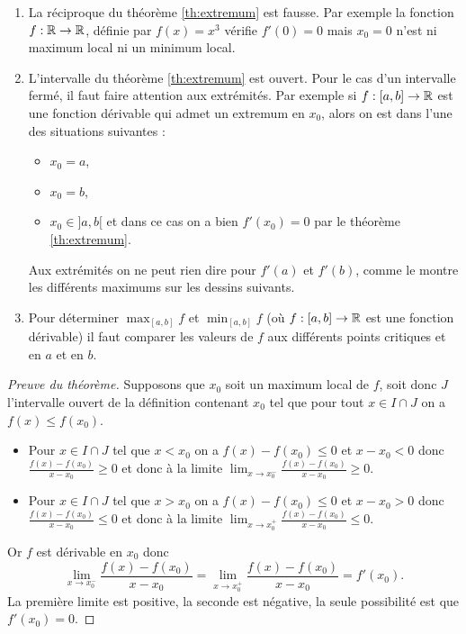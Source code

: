 \documentclass[class=report,crop=false]{standalone}
\begin{document}
\begin{remarque*}
\sauteligne
\begin{enumerate}
  \item La réciproque du théorème \ref{th:extremum}  est fausse.
Par exemple la fonction $f : \mathbb{R} \to \mathbb{R}$, définie par $f(x)= x^3$
vérifie $f'(0)=0$ mais $x_0=0$ n'est ni maximum local ni un minimum local.

  \item L'intervalle du théorème \ref{th:extremum} est ouvert. Pour le cas d'un intervalle fermé, il faut faire attention
aux extrémités. Par exemple si $f : [a,b] \to \mathbb{R}$ est une fonction dérivable qui admet un extremum en $x_0$,
alors on est dans l'une des situations suivantes :
\begin{itemize}
  \item $x_0= a$,
  \item $x_0 =b$,
  \item $x_0 \in ]a,b[$ et dans ce cas on a bien $f'(x_0)=0$ par le théorème \ref{th:extremum}.
\end{itemize}
Aux extrémités on ne peut rien dire pour $f'(a)$ et $f'(b)$, comme le montre les différents maximums sur
les dessins suivants.


  \item Pour déterminer $\max_{[a,b]} f$ et $\min_{[a,b]} f$ (où $f:[a,b]\to \mathbb{R}$ est une fonction dérivable) il faut comparer
les valeurs de $f$ aux différents points critiques et en $a$ et en $b$.
\end{enumerate}
\end{remarque*}

\begin{proof}[Preuve du théorème]
Supposons que $x_0$ soit un maximum local de $f$, soit donc $J$ l'intervalle ouvert de la définition
contenant $x_0$ tel que pour tout $x\in I \cap J$ on a $f(x) \le f(x_0)$.
\begin{itemize}
  \item Pour $x \in I\cap J$ tel que $x < x_0$ on a $f(x)-f(x_0) \le 0$ et $x-x_0<0$ donc $\frac{f(x)-f(x_0)}{x-x_0} \ge 0$
et donc à la limite $\lim_{x \to x_0^-} \frac{f(x)-f(x_0)}{x-x_0} \ge 0$.
  \item Pour $x \in I\cap J$ tel que $x > x_0$ on a $f(x)-f(x_0) \le 0$ et $x-x_0>0$ donc $\frac{f(x)-f(x_0)}{x-x_0} \le 0$
et donc à la limite $\lim_{x \to x_0^+} \frac{f(x)-f(x_0)}{x-x_0} \le 0$.
\end{itemize}
Or $f$ est dérivable en $x_0$ donc
$$\lim_{x \to x_0^-} \frac{f(x)-f(x_0)}{x-x_0} = \lim_{x \to x_0^+} \frac{f(x)-f(x_0)}{x-x_0} = f'(x_0).$$
La première limite est positive, la seconde est négative, la seule possibilité est que $f'(x_0)=0$.
\end{proof}
\end{document}
